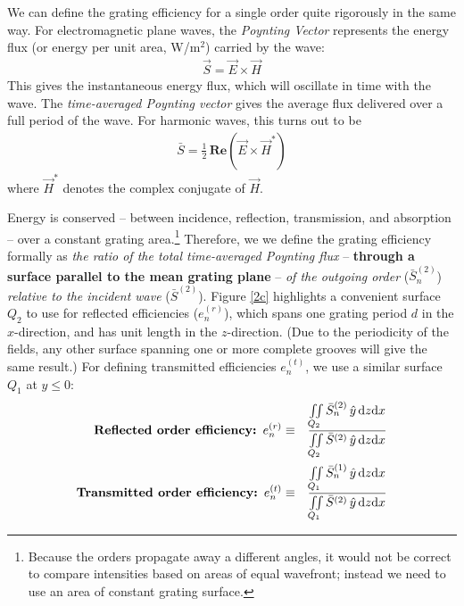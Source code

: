 We can define the grating efficiency for a single order quite rigorously in the same way.  For electromagnetic plane waves, the \emph{Poynting Vector} represents the energy flux (or energy per unit area, W/m$^2$) carried by the wave:
\begin{eqnarray}
\vec S = \vec E \times \vec H
\end{eqnarray}
This gives the instantaneous energy flux, which will oscillate in time with the wave.  The \emph{time-averaged Poynting vector} gives the average flux delivered over a full period of the wave.  For harmonic waves, this turns out to be
\begin{eqnarray}
 \bar S  = \frac{1}{2}\, \mathbf{Re} \left( \vec E \times \vec H^\ast \right)
\end{eqnarray}
where $\vec H^\ast$ denotes the complex conjugate of $\vec H$.

Energy is conserved -- between incidence, reflection, transmission, and absorption -- over a constant grating area.\footnote{Because the orders propagate away a different angles, it would not be correct to compare intensities based on areas of equal wavefront; instead we need to use an area of constant grating surface.}  Therefore, we we define the grating efficiency formally as \emph{the ratio of the total time-averaged Poynting flux} -- \textbf{through a surface parallel to the mean grating plane} -- \emph{of the outgoing order }($\bar S_n^{(2)}$) \emph{relative to the incident wave} ($\bar S^{(2)}$).  Figure \ref{2c} highlights a convenient surface $Q_2$ to use for reflected efficiencies ($e_n^{(r)}$), which spans one grating period $d$ in the $x$-direction, and has unit length in the $z$-direction.  (Due to the periodicity of the fields, any other surface spanning one or more complete grooves will give the same result.)  For defining transmitted efficiencies $e_n^{(t)}$, we use a similar surface $Q_1$ at $y\leq0$:
\begin{eqnarray}
\textrm{\textbf{Reflected order efficiency: }}e_n^{(r)} &\equiv& \frac{\iint \limits_{Q_2} \bar S_n^{(2)} \, \hat y \, \mathrm{d} z \mathrm{d} x}{ \iint \limits_{Q_2} \bar S^{(2)} \, \hat y \, \mathrm{d} z \mathrm{d} x} \\
\textrm{\textbf{Transmitted order efficiency: }}e_n^{(t)} &\equiv&\frac{\iint \limits_{Q_1} \bar S_n^{(1)}\, \hat y \, \mathrm{d} z \mathrm{d} x}{ \iint \limits_{Q_1} \bar S^{(2)}\, \hat y \, \mathrm{d} z \mathrm{d} x}
\end{eqnarray}
          
